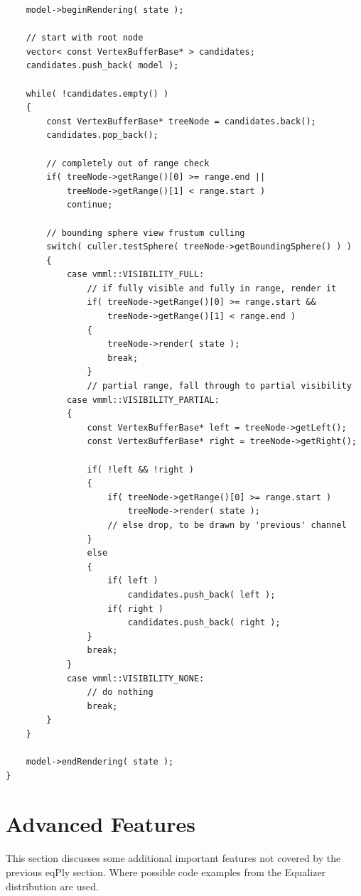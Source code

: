\documentclass[10pt,a4]{scrartcl}
\begin{document}
{\footnotesize\begin{lstlisting}
    model->beginRendering( state );
        
    // start with root node
    vector< const VertexBufferBase* > candidates;
    candidates.push_back( model );
        
    while( !candidates.empty() )
    {
        const VertexBufferBase* treeNode = candidates.back();
        candidates.pop_back();
            
        // completely out of range check
        if( treeNode->getRange()[0] >= range.end || 
            treeNode->getRange()[1] < range.start )
            continue;
            
        // bounding sphere view frustum culling
        switch( culler.testSphere( treeNode->getBoundingSphere() ) )
        {
            case vmml::VISIBILITY_FULL:
                // if fully visible and fully in range, render it
                if( treeNode->getRange()[0] >= range.start && 
                    treeNode->getRange()[1] < range.end )
                {
                    treeNode->render( state );
                    break;
                }
                // partial range, fall through to partial visibility
            case vmml::VISIBILITY_PARTIAL:
            {
                const VertexBufferBase* left = treeNode->getLeft();
                const VertexBufferBase* right = treeNode->getRight();
            
                if( !left && !right )
                {
                    if( treeNode->getRange()[0] >= range.start )
                        treeNode->render( state );
                    // else drop, to be drawn by 'previous' channel
                }
                else
                {
                    if( left )
                        candidates.push_back( left );
                    if( right )
                        candidates.push_back( right );
                }
                break;
            }
            case vmml::VISIBILITY_NONE:
                // do nothing
                break;
        }
    }
        
    model->endRendering( state );
}
\end{lstlisting}}


\section{Advanced Features}

This section discusses some additional important features not covered
by the previous \textsf{eqPly} section. Where possible code examples
from the Equalizer distribution are used.
\end{document}
